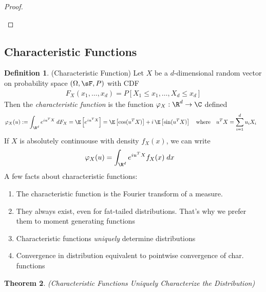 \documentclass[12pt]{article}
\theoremstyle{plain}
\newtheorem{thm}{Theorem}[section]
\theoremstyle{definition}
\newtheorem{defn}[thm]{Definition}
\theoremstyle{remark}
\newcommand{\ra}{\rightarrow}
\begin{document}
\begin{proof}
\begin{enumerate}
\end{enumerate}
\end{proof}


\clearpage
\subsection{Characteristic Functions}


\begin{defn}(Characteristic Function)
Let $X$ be a $d$-dimensional random vector on probability space
$(\Omega,\sF,P)$ with CDF
\begin{align*}
  F_{X}(x_1,\ldots,x_d)
  =
  P[X_1\leq x_1,\ldots, X_d\leq x_d]
\end{align*}
Then the \emph{characteristic function} is the function
$\varphi_X:\R^d\ra \C$ defined
\begin{align*}
  \varphi_X(u)
  &:= \int_{\R^d} e^{iu^TX} \; dF_{X}
  = \E\left[e^{iu^TX}\right] =
  \E\left[\cos(u^TX)\right]+i\,\E\left[\sin(u^TX)\right]
  \quad\text{where}\quad u^T X = \sum_{i=1}^d u_iX_i
\end{align*}
If $X$ is absolutely continuouse with density $f_{X}(x)$, we
can write
\begin{align*}
  \varphi_X(u)
  &=
  \int_{\R^d} e^{iu^TX} f_{X}(x)\; dx
\end{align*}
A few facts about characteristic functions:
\begin{enumerate}[label=(\roman*)]
  \item The characteristic function is the Fourier transform of a
    measure.
  \item They always exist, even for fat-tailed distributions. That's why
    we prefer them to moment generating functions
  \item Characteristic functions \emph{uniquely} determine distributions
  \item Convergence in distribution equivalent to pointwise
    convergence of char. functions
\end{enumerate}
\end{defn}

\begin{thm}
\label{thm:charfcnunq}
\emph{(Characteristic Functions Uniquely Characterize the Distribution)}
\end{thm}
\end{document}

